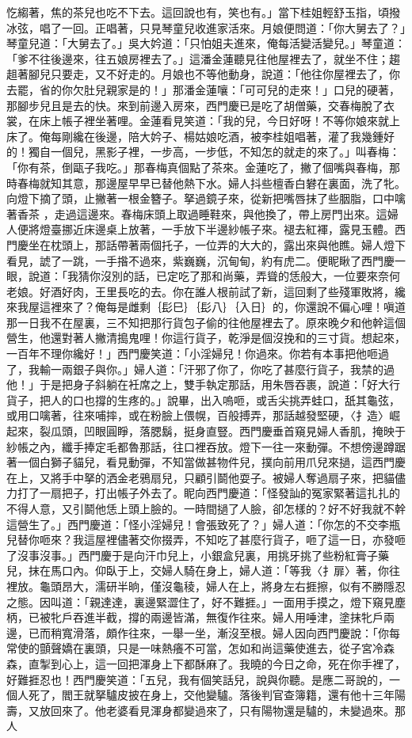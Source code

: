 \begin{showcontents}{}
忔縐著，焦的茶兒也吃不下去。這回說也有，笑也有。」當下桂姐輕舒玉指，頃撥冰弦，唱了一回。正唱著，只見琴童兒收進家活來。月娘便問道：「你大舅去了？」琴童兒道：「大舅去了。」吳大妗道：「只怕姐夫進來，俺每活變活變兒。」琴童道：「爹不往後邊來，往五娘房裡去了。」這潘金蓮聽見往他屋裡去了，就坐不住；趨趄著腳兒只要走，又不好走的。月娘也不等他動身，說道：「他往你屋裡去了，你去罷，省的你欠肚兒親家是的！」那潘金蓮嚷：「可可兒的走來！」口兒的硬著，那腳步兒且是去的快。來到前邊入房來，西門慶已是吃了胡僧藥，交春梅脫了衣裳，在床上帳子裡坐著哩。金蓮看見笑道：「我的兒，今日好呀！不等你娘來就上床了。俺每剛纔在後邊，陪大妗子、楊姑娘吃酒，被李桂姐唱著，灌了我幾鍾好的！獨自一個兒，黑影子裡，一步高，一步低，不知怎的就走的來了。」叫春梅：「你有茶，倒甌子我吃。」那春梅真個點了茶來。金蓮吃了，撇了個嘴與春梅，那時春梅就知其意，那邊屋早早已替他熱下水。婦人抖些檀香白礬在裏面，洗了牝。向燈下摘了頭，止撇著一根金簪子。拏過鏡子來，從新把嘴唇抹了些胭脂，口中噙著香茶 ，走過這邊來。春梅床頭上取過睡鞋來，與他換了，帶上房門出來。這婦人便將燈臺挪近床邊桌上放著，一手放下半邊紗帳子來。褪去紅褌，露見玉體。西門慶坐在枕頭上，那話帶著兩個托子，一位弄的大大的，露出來與他瞧。婦人燈下看見，諕了一跳，一手揝不過來，紫巍巍，沉甸甸，約有虎二。便眤瞅了西門慶一眼，說道：「我猜你沒別的話，已定吃了那和尚藥，弄聳的恁般大，一位要來奈何老娘。好酒好肉，王里長吃的去。你在誰人根前試了新，這回剩了些殘軍敗將，纔來我屋這裡來了？俺每是雌剩｛髟巳｝｛髟八｝｛入日｝的，你還說不偏心哩！嗔道那一日我不在屋裏，三不知把那行貨包子偷的往他屋裡去了。原來晚夕和他幹這個營生，他還對著人撇清搗鬼哩！你這行貨子，乾淨是個沒挽和的三寸貨。想起來，一百年不理你纔好！」西門慶笑道：「小淫婦兒！你過來。你若有本事把他咂過了，我輸一兩銀子與你。」婦人道：「汗邪了你了，你吃了甚麼行貨子，我禁的過他！」于是把身子斜躺在衽席之上，雙手執定那話，用朱唇吞裹，說道：「好大行貨子，把人的口也撐的生疼的。」說畢，出入嗚咂，或舌尖挑弄蛙口，舐其龜弦，或用口噙著，往來哺摔，或在粉臉上偎幌，百般搏弄，那話越發堅硬，〈扌造〉崛起來，裂瓜頭，凹眼圓睜，落腮鬍，挺身直豎。西門慶垂首窺見婦人香肌，掩映于紗帳之內，纖手捧定毛都魯那話，往口裡吞放。燈下一往一來動彈。不想傍邊蹲踞著一個白獅子貓兒，看見動彈，不知當做甚物件兒，撲向前用爪兒來撾，這西門慶在上，又將手中拏的洒金老鴉扇兒，只顧引鬬他耍子。被婦人奪過扇子來，把貓儘力打了一扇把子，打出帳子外去了。眤向西門慶道：「怪發訕的冤家緊著這扎扎的不得人意，又引鬬他恁上頭上臉的。一時間撾了人臉，卻怎樣的？好不好我就不幹這營生了。」西門慶道：「怪小淫婦兒！會張致死了？」婦人道：「你怎的不交李瓶兒替你咂來？我這屋裡儘著交你掇弄，不知吃了甚麼行貨子，咂了這一日，亦發咂了沒事沒事。」西門慶于是向汗巾兒上，小銀盒兒裏，用挑牙挑了些粉紅膏子藥兒，抹在馬口內。仰臥于上，交婦人騎在身上，婦人道：「等我〈扌扉〉著，你往裡放。龜頭昂大，濡研半晌，僅沒龜稜，婦人在上，將身左右捱擦，似有不勝隱忍之態。因叫道：「親達達，裏邊緊澀住了，好不難捱。」一面用手摸之，燈下窺見塵柄，已被牝戶吞進半截，撐的兩邊皆滿，無復作往來。婦人用唾津，塗抹牝戶兩邊，已而稍寬滑落，頗作往來，一舉一坐，漸沒至根。婦人因向西門慶說：「你每常使的顫聲嬌在裏頭，只是一味熱癢不可當，怎如和尚這藥使進去，從子宮冷森森，直掣到心上，這一回把渾身上下都酥麻了。我曉的今日之命，死在你手裡了，好難捱忍也！西門慶笑道：「五兒，我有個笑話兒，說與你聽。是應二哥說的，一個人死了，閻王就拏驢皮披在身上，交他變驢。落後判官查簿籍，還有他十三年陽壽，又放回來了。他老婆看見渾身都變過來了，只有陽物還是驢的，未變過來。那人
\end{showcontents}
